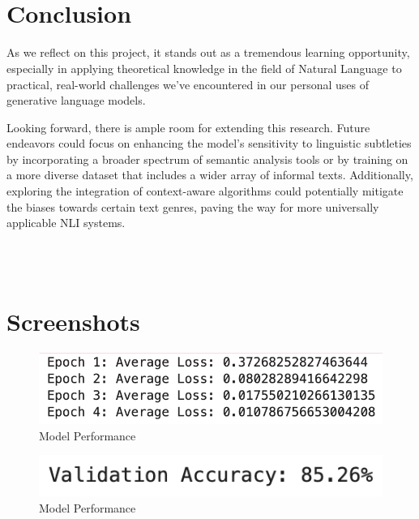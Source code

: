 \documentclass[11pt,a4paper]{article}
\begin{document}
\\~\\

\section{Conclusion}

As we reflect on this project, it stands out as a tremendous learning opportunity, especially in applying theoretical knowledge in the field of Natural Language to practical, real-world challenges we’ve encountered in our personal uses of generative language models. 

Looking forward, there is ample room for extending this research. Future endeavors could focus on enhancing the model's sensitivity to linguistic subtleties by incorporating a broader spectrum of semantic analysis tools or by training on a more diverse dataset that includes a wider array of informal texts. Additionally, exploring the integration of context-aware algorithms could potentially mitigate the biases towards certain text genres, paving the way for more universally applicable NLI systems. 

\\~\\
\section{Screenshots}
\pagebreak 

\begin{figure}
    \centering
    \includegraphics[width=1\linewidth]{Epochs.png}
    \caption{Model Performance}
    \label{fig:enter-label}
\end{figure}
\begin{figure}
    \centering
    \includegraphics[width=1\linewidth]{ValAccuracy.png}
    \caption{Model Performance}
    \label{fig:enter-label}
\end{figure}
\end{document}
